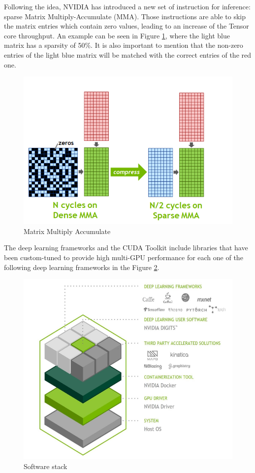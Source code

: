 Following the idea, NVIDIA has introduced a new set of instruction for inference: sparse Matrix Multiply-Accumulate (MMA). Those instructions are able to skip the matrix entries which contain zero values, leading to an increase of the Tensor core throughput. An example can be seen in Figure \ref{fig:mma}, where the light blue matrix has a sparsity of 50\%. It is also important to mention that the non-zero entries of the light blue matrix will be matched with the correct entries of the red one.
\begin{figure}[!htbp]
\centering
\captionsetup{justification=centering}
\includegraphics[scale=0.35]{./figure/mma.png}
\caption{Matrix Multiply Accumulate \cite{paper:41}}
\label{fig:mma}
\end{figure}

\newpage
The deep learning frameworks and the CUDA Toolkit include libraries that have been custom-tuned to provide high multi-GPU performance for each one of the following deep learning frameworks in the Figure \ref{fig:swtesla}.

\begin{figure}[!htbp]
\centering
\captionsetup{justification=centering}
\includegraphics[scale=0.6]{./figure/sw_stack_tesla.PNG}
\caption{Software stack \cite{paper:41}}
\label{fig:swtesla}
\end{figure}

